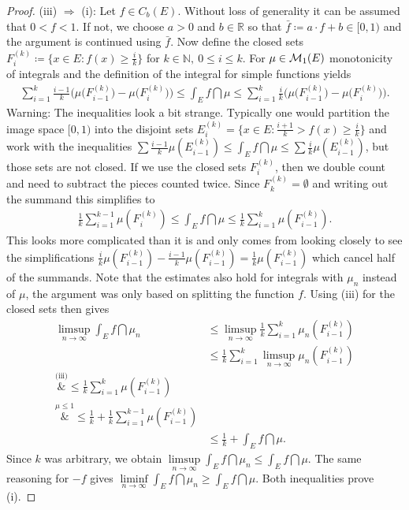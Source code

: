\begin{proof}[Proof]
	(iii) $\Rightarrow$ (i): Let $f\in C_b(E)$. Without loss of generality it can be assumed that $0<f<1$. If not, we choose $a>0$ and $b\in\mathbb{R}$ so that $\bar{f} \coloneqq a\cdot f +b \in [0,1)$ and the argument is continued using $\bar f$. Now define the closed sets $F_i^{(k)} \coloneqq \{ x\in E \colon {f}(x) \geq \frac{i}{k} \}$ for $k\in \mathbb{N}, \: 0 \leq i \leq k$. For $\mu \in \mathcal{M}_1(E)$ monotonicity of integrals and the definition of the integral for simple functions yields
	\begin{align*}
		\sum_{i=1}^k \frac{i-1}{k} \bigg( \mu \big( F_{i-1}^{(k)} \big) - \mu \big(F_i^{(k)}\big)\bigg) \leq \int_E {f}\dint \mu \leq \sum_{i=1}^k \frac{i}{k} \bigg( \mu \big( F_{i-1}^{(k)} \big) - \mu \big(F_i^{(k)}\big)\bigg).
	\end{align*}
	Warning: The inequalities look a bit strange. Typically one would partition the image space $[0,1)$ into the disjoint sets $E^{(k)}_i=\{x \in E \colon \frac{i+1}{k} > {f}(x) \geq \frac{i}{k} \}$ and work with  the inequalities $\sum \frac{i-1}{k} \mu(E_{i-1}^{(k)}) \leq \int_E {f} \dint \mu \leq \sum \frac{i}{k}  \mu(E_{i-1}^{(k)})$, but those sets are not closed. If we use the closed sets $F^{(k)}_i$, then we double count and need to subtract the pieces counted twice. Since $F_k^{(k)} = \emptyset$ and writing out the summand this simplifies to 
	\begin{align*}
		\frac{1}{k} \sum_{i=1}^{k-1} \mu(F_i^{(k)}) \leq \int_E {f}\dint \mu \leq \frac{1}{k} \sum_{i=1}^{k} \mu(F_{i-1}^{(k)}).
	\end{align*}
	This looks more complicated than it is and only comes from looking closely to see the simplifications $\frac{i}{k} \mu ( F_{i-1}^{(k)} )-\frac{i-1}{k} \mu ( F_{i-1}^{(k)})=\frac{1}{k} \mu ( F_{i-1}^{(k)})$ which cancel half of the summands. Note that the estimates also hold for integrals with $\mu_n$ instead of $\mu$, the argument was only based on splitting the function $f$. Using (iii) for the closed sets then gives
	\begin{align*}
		\limsup\limits_{n\to\infty} \int_E {f} \dint \mu_n &\leq \limsup\limits_{n\to\infty} \frac{1}{k} \sum_{i=1}^{k} \mu_n (F_{i-1}^{(k)}) \\
			&\leq \frac{1}{k} \sum_{i=1}^{k} \limsup\limits_{n\to\infty} \mu_n (F_{i-1}^{(k)}) \\
			\overset{\text{(iii)}}&{\leq} \frac{1}{k} \sum_{i=1}^{k} \mu (F_{i-1}^{(k)}) \\
			\overset{ \mu\leq 1 }&{\leq} \frac{1}{k} +\frac{1}{k} \sum_{i=1}^{k-1} \mu (F_{i-1}^{(k)}) \\
			&\leq \frac{1}{k} + \int_E {f} \dint \mu.
	\end{align*}
	Since $k$ was arbitrary, we obtain $\limsup\limits_{n\to\infty} \int_E {f} \dint \mu_n \leq \int_E {f} \dint \mu$. The same reasoning for $-f$ gives $\liminf\limits_{n\to\infty} \int_E  f \dint \mu_n \geq \int_E f \dint \mu$. Both inequalities prove (i).
\end{proof}
